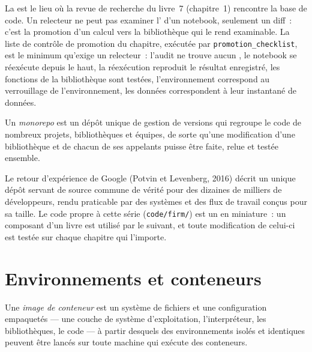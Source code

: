 La  est le lieu où la revue de recherche du livre~7 (chapitre~1) rencontre la base de code. Un relecteur ne peut pas examiner l' d'un notebook, seulement un
diff~: c'est la promotion d'un calcul vers la bibliothèque qui le rend examinable. La liste de contrôle de promotion du chapitre, exécutée par
\texttt{promotion\_checklist}, est le minimum qu'exige un relecteur~: l'audit ne trouve aucun , le notebook se réexécute depuis le haut, la réexécution
reproduit le résultat enregistré, les fonctions de la bibliothèque sont testées, l'environnement correspond au verrouillage de l'environnement, les données correspondent à leur instantané de données.

\begin{definition}[Monorepo]\label{def:pl:the-research-environment:monorepo}
Un \emph{monorepo} est un dépôt unique de gestion de versions qui regroupe le code de nombreux projets, bibliothèques et équipes,
de sorte qu'une modification d'une bibliothèque et de chacun de ses appelants puisse être faite, relue et testée ensemble.
\end{definition}

Le retour d'expérience de Google (Potvin et Levenberg, 2016) décrit un unique dépôt servant de source commune de vérité pour des dizaines de
milliers de développeurs, rendu praticable par des systèmes et des flux de travail conçus pour sa taille. Le code propre à cette série (\texttt{code/firm/}) est un  en miniature~: un
composant d'un livre est utilisé par le suivant, et toute modification de celui-ci est testée sur chaque chapitre qui l'importe.

\section{Environnements et conteneurs}

\begin{definition}\label{def:pl:the-research-environment:container}
Une \emph{image de conteneur} est un système de fichiers et une configuration empaquetés --- une couche de système d'exploitation, l'interpréteur,
les bibliothèques, le code --- à partir desquels des environnements isolés et identiques peuvent être lancés sur toute machine qui exécute des conteneurs.
\end{definition}

